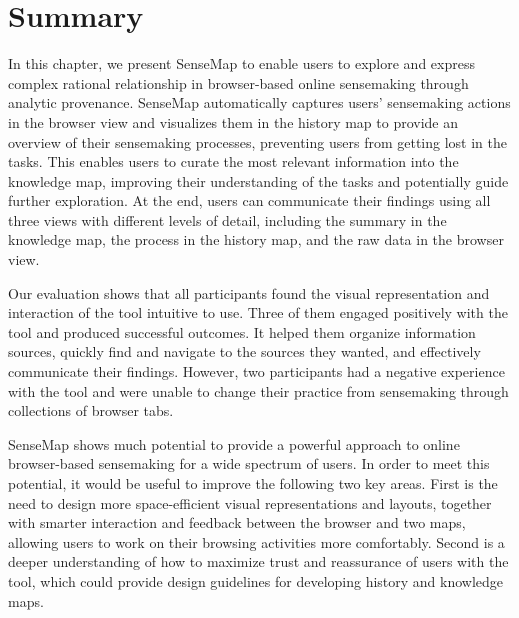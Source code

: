 \section{Summary}
In this chapter, we present SenseMap to enable users to explore and express complex rational relationship in browser-based online sensemaking through analytic provenance. SenseMap automatically captures users' sensemaking actions in the browser view and visualizes them in the history map to provide an overview of their sensemaking processes, preventing users from getting lost in the tasks. This enables users to curate the most relevant information into the knowledge map, improving their understanding of the tasks and potentially guide further exploration. At the end, users can communicate their findings using all three views with different levels of detail, including the summary in the knowledge map, the process in the history map, and the raw data in the browser view.

Our evaluation shows that all participants found the visual representation and interaction of the tool intuitive to use. Three of them engaged positively with the tool and produced successful outcomes. It helped them organize information sources, quickly find and navigate to the sources they wanted, and effectively communicate their findings. However, two participants had a negative experience with the tool and were unable to change their practice from sensemaking through collections of browser tabs.

SenseMap shows much potential to provide a powerful approach to online browser-based sensemaking for a wide spectrum of users. In order to meet this potential, it would be useful to improve the following two key areas. First is the need to design more space-efficient visual representations and layouts, together with smarter interaction and feedback between the browser and two maps, allowing users to work on their browsing activities more comfortably. Second is a deeper understanding of how to maximize trust and reassurance of users with the tool, which could provide design guidelines for developing history and knowledge maps.